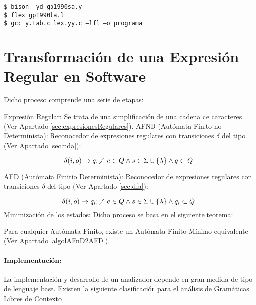 \begin{verbatim}
$ bison -yd gp1990sa.y
$ flex gp1990la.l
$ gcc y.tab.c lex.yy.c –lfl –o programa
\end{verbatim}



\section{Transformación de una Expresión Regular en
Software}

Dicho proceso comprende una serie de etapas:



 {}Expresión Regular: Se trata de una simplificación de una cadena de caracteres (Ver Apartado \ref{sec:expresionesRegulares}).
 AFND (Autómata Finito no Determinista): Reconocedor de expresiones
regulares con transiciones $\delta$ del tipo (Ver Apartado \ref{sec:nda}):

\begin{equation}\label{deltaAFND}
\delta(i,o) \rightarrow q; \diagup\ e\in Q \wedge s \in \Sigma \cup \{\lambda\} \wedge q
\subset Q
\end{equation}

 AFD (Autómata Finitio Determinista): Reconocedor de expresiones
regulares con transiciones $\delta$ del tipo (Ver Apartado \ref{sec:dfa}):

\begin{equation}\label{deltaAFD}
\delta(i,o) \rightarrow q_i; \diagup\ e\in Q \wedge s \in \Sigma \cup \{\lambda\} \wedge q_{i}
\subset Q
\end{equation}
 Minimización de los estados: Dicho proceso se basa en el siguiente teorema:

{\thm Para cualquier Autómata Finito, existe un Autómata Finito Mínimo
equivalente (Ver Apartado \ref{algolAFnD2AFD}).}

\paragraph*{Implementación:} La implementación y desarrollo de un analizador 
depende en gran medida de tipo de lenguaje base. Existen la siguiente 
clasificación para el análisis de Gramáticas Libres de 
Contexto

